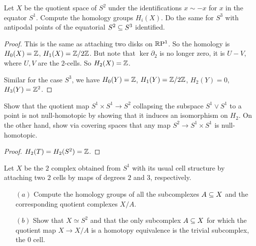 \begin{exercise}
Let $X$ be the quotient space of $S^2$ under the identifications $x\sim-x$ for $x$ in the equator $S^1$. Compute the homology groups $H_i(X)$. Do the same for $S^3$ with antipodal points of the equatorial $S^2\subseteq S^3$ identified.
\end{exercise}
\begin{proof}
This is the same as attaching two disks on $\mathbb{R}\mathrm{P}^1$. So the homology is $H_0(X)=\mathbb{Z}$, $H_1(X)=\mathbb{Z}/2\mathbb{Z}$. But note that $\ker\partial_2$ is no longer zero, it is $U-V$, where $U,V$ are the $2$-cells. So $H_2(X)=\mathbb{Z}$.\par
Similar for the case $S^3$, we have $H_0(Y)=\mathbb{Z}$, $H_1(Y)=\mathbb{Z}/2\mathbb{Z}$, $H_2(Y)=0$, $H_3(Y)=\mathbb{Z}^2$.
\end{proof}
\begin{exercise}
Show that the quotient map $S^1\times S^1\to S^2$ collapsing the subspace $S^1\vee S^1$ to a point is not null-homotopic by showing that it induces an isomorphism on $H_2$. On the other hand, show via covering spaces that any map $S^2\to S^1\times S^1$ is null-homotopic.
\end{exercise}
\begin{proof}
$H_2(T)=H_2(S^2)=\mathbb{Z}$.
\end{proof}
\begin{exercise}
Let $X$ be the $2$ complex obtained from $S^1$ with its usual cell structure by attaching two $2$ cells by maps of degrees $2$ and $3$, respectively.
\begin{itemize}
\item[$(a)$]Compute the homology groups of all the subcomplexes $A\subseteq X$ and the corresponding quotient complexes $X/A$.
\item[$(b)$]Show that $X\simeq S^2$ and that the only subcomplex $A\subseteq X$ for which the quotient map $X\to X/A$ is a homotopy equivalence is the trivial subcomplex, the $0$ cell.
\end{itemize}
\end{exercise}
